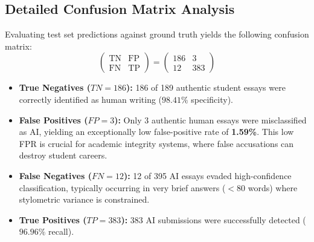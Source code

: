 \documentclass[journal]{IEEEtran}
\begin{document}
\begin{table}[!t]
\caption{Quantitative Classification Performance on Benchmark Dataset}
\label{tab:classification_metrics}
\centering
{}
\end{table}

\subsection{Detailed Confusion Matrix Analysis}
Evaluating test set predictions against ground truth yields the following confusion matrix:
\begin{equation}
\begin{pmatrix} \text{TN} & \text{FP} \\ \text{FN} & \text{TP} \end{pmatrix} = \begin{pmatrix} 186 & 3 \\ 12 & 383 \end{pmatrix}
\end{equation}

\begin{itemize}
    \item \textbf{True Negatives ($TN = 186$):} 186 of 189 authentic student essays were correctly identified as human writing ($98.41\%$ specificity).
    \item \textbf{False Positives ($FP = 3$):} Only 3 authentic human essays were misclassified as AI, yielding an exceptionally low false-positive rate of \textbf{1.59\%}. This low FPR is crucial for academic integrity systems, where false accusations can destroy student careers.
    \item \textbf{False Negatives ($FN = 12$):} 12 of 395 AI essays evaded high-confidence classification, typically occurring in very brief answers ($< 80$ words) where stylometric variance is constrained.
    \item \textbf{True Positives ($TP = 383$):} 383 AI submissions were successfully detected ($96.96\%$ recall).
\end{itemize}
\end{document}

